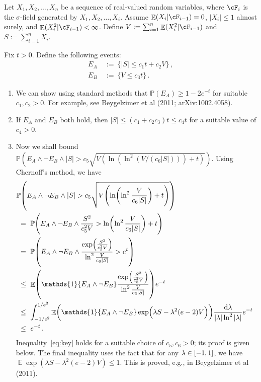 \documentclass[11pt]{article}
\DeclareMathOperator{\E}{\mathbb{E}}
\renewcommand{\P}{\ensuremath{\mathbb{P}}}
\theoremstyle{remark}
\theoremstyle{definition}
\newcommand\braces[1]{\{#1\}}
\renewcommand\abs[1]{|#1|} %
\newcommand\ind[1]{\ensuremath{\mathds{1}\{#1\}}}
\newcommand\Parens[1]{\mleft(#1\mright)}
\begin{document}
Let $X_1, X_2, \dotsc, X_n$ be a sequence of real-valued random
variables, where $\cF_i$ is the $\sigma$-field generated by $X_1, X_2,
\dotsc, X_i$.
Assume $\E(X_i|\cF_{i-1}) = 0$, $\abs{X_i} \leq 1$ almost surely, and
$\E(X_i^2|\cF_{i-1}) < \infty$.
Define $V := \sum_{i=1}^n \E(X_i^2|\cF_{i-1})$ and $S := \sum_{i=1}^n
X_i$.

Fix $t>0$.
Define the following events:
\begin{align*}
  E_A & \ := \ \braces{ |S| \leq c_1 t + c_2 V }
  \,, \\
  E_B & \ := \ \braces{ V \leq c_3 t }
  \,.
\end{align*}
\begin{enumerate}
  \item
    We can show using standard methods that $\P(E_A) \geq 1-2e^{-t}$
    for suitable $c_1, c_2 > 0$.
    For example, see Beygelzimer et al (2011; arXiv:1002.4058).

  \item
    If $E_A$ and $E_B$ both hold, then $|S| \leq (c_1 + c_2c_3) t \leq
    c_4 t$ for a suitable value of $c_4 > 0$.

  \item
    Now we shall bound $\P(E_A \wedge \neg E_B \wedge |S| > c_5
    \sqrt{V (\ln(\ln^2(V/(c_6|S|))) + t)})$.
    Using Chernoff's method, we have
    \begin{align}
      \lefteqn{
        \P\Parens{
          E_A \wedge \neg E_B \wedge
          |S| > c_5 \sqrt{
            V \Parens{
              \ln\Parens{
                \ln^2\frac{V}{c_6|S|}
              } + t
            }
          }
        }
      }
      \notag \\
      & \ = \
      \P\Parens{
        E_A \wedge \neg E_B \wedge
        \frac{S^2}{c_5^2V}
        > \ln\Parens{\ln^2\frac{V}{c_6|S|}} + t
      }
      \notag \\
      & \ = \
      \P\Parens{
        E_A \wedge \neg E_B \wedge
        \frac{
          \exp\Parens{\frac{S^2}{c_5^2V}}
        }{
          \ln^2\frac{V}{c_6|S|}
        }
        > e^t
      }
      \notag \\
      & \ \leq \
      \E\Parens{
        \ind{E_A \wedge \neg E_B}
        \frac{
          \exp\Parens{\frac{S^2}{c_5^2V}}
        }{
          \ln^2\frac{V}{c_6|S|}
        }
      }
      e^{-t}
      \notag \\
      & \ \leq \
      \int_{-1/e^2}^{1/e^2}
      \E\Parens{
        \ind{E_A \wedge \neg E_B}
        \exp\Parens{ \lambda S - \lambda^2 (e-2) V }
      }
      \frac{\dif\lambda}{\abs{\lambda}\ln^2\abs{\lambda}}
      e^{-t}
      \label{eq:key} \\
      & \ \leq \
      e^{-t}
      \,.
    \end{align}
    Inequality~\eqref{eq:key} holds for a suitable choice of
    $c_5, c_6 > 0$; its proof is given below.
    The final inequality uses the fact that for any $\lambda \in
    \intcc{-1,1}$, we have $\E\exp(\lambda S - \lambda^2 (e-2) V) \leq
    1$.
    This is proved, e.g., in Beygelzimer et al (2011).


\end{enumerate}
\end{document}
